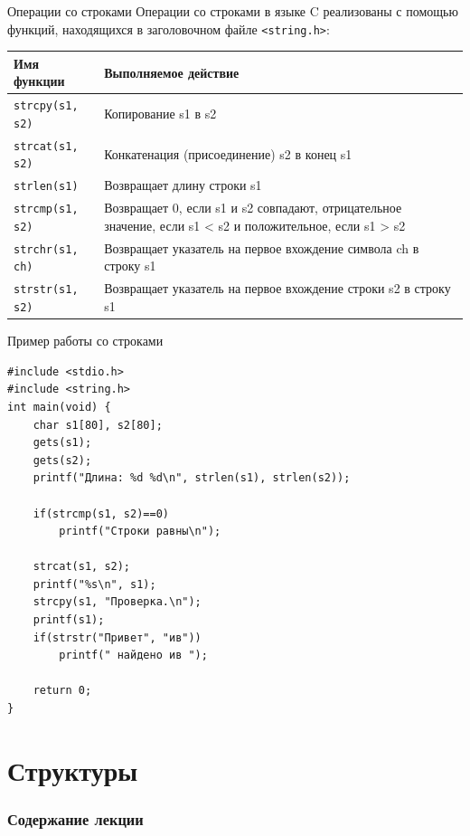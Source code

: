 \documentclass{beamer}
\begin{document}
\begin{frame}{Операции со строками}
    Операции со строками в языке C реализованы с помощью функций,
    находящихся в заголовочном файле \texttt{<string.h>}:
    
    \medskip
    
    \begin{tabular}{|p{3cm}|p{8cm}|}
        \hline
        \textbf{Имя функции} & \textbf{Выполняемое действие} \\ \hline
        \texttt{strcpy(s1, s2)} & Копирование s1 в s2 \\ \hline
        \texttt{strcat(s1, s2)} & Конкатенация (присоединение) s2 в конец s1 \\ \hline
        \texttt{strlen(s1)} & Возвращает длину строки s1 \\ \hline
        \texttt{strcmp(s1, s2)} & Возвращает 0, если s1 и s2  совпадают, отрицательное значение, если s1 < s2 и положительное, если s1 > s2 \\ \hline
        \texttt{strchr(s1, ch)} & Возвращает указатель на первое вхождение символа ch в строку s1 \\ \hline
        \texttt{strstr(s1, s2)} & Возвращает указатель на первое вхождение строки s2 в строку s1\\ \hline
    \end{tabular}
\end{frame}

\begin{frame}[fragile]{Пример работы со строками}
\begin{verbatim}
#include <stdio.h>
#include <string.h>
int main(void) {
    char s1[80], s2[80];
    gets(s1);
    gets(s2);
    printf("Длина: %d %d\n", strlen(s1), strlen(s2));
    
    if(strcmp(s1, s2)==0) 
        printf("Строки равны\n");
    
    strcat(s1, s2);
    printf("%s\n", s1);
    strcpy(s1, "Проверка.\n");
    printf(s1);
    if(strstr("Привет", "ив")) 
        printf(" найдено ив ");
    
    return 0;
}
\end{verbatim}
\end{frame}

\section{Структуры}

\begin{frame}
  \frametitle{Содержание лекции}
  \tableofcontents[current]
\end{frame}
\end{document}

